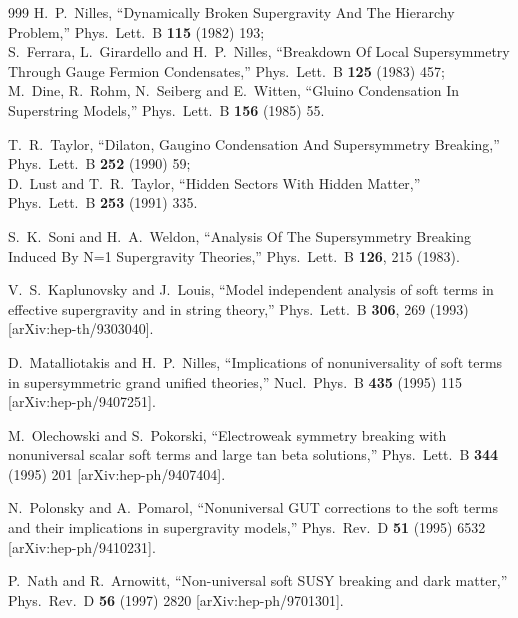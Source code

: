 \begin{thebibliography}{999}
H.~P.~Nilles,
``Dynamically Broken Supergravity And The Hierarchy Problem,''
Phys.\ Lett.\ B {\bf 115} (1982) 193;\\
S.~Ferrara, L.~Girardello and H.~P.~Nilles,
``Breakdown Of Local Supersymmetry Through Gauge Fermion Condensates,''
Phys.\ Lett.\ B {\bf 125} (1983) 457;\\
M.~Dine, R.~Rohm, N.~Seiberg and E.~Witten,
``Gluino Condensation In Superstring Models,''
Phys.\ Lett.\ B {\bf 156} (1985) 55.

  T.~R.~Taylor,
  ``Dilaton, Gaugino Condensation And Supersymmetry Breaking,''
  Phys.\ Lett.\ B {\bf 252} (1990) 59;\\
 D.~Lust and T.~R.~Taylor,
  ``Hidden Sectors With Hidden Matter,''
  Phys.\ Lett.\ B {\bf 253} (1991) 335.

  S.~K.~Soni and H.~A.~Weldon,
  ``Analysis Of The Supersymmetry Breaking Induced By N=1 Supergravity
  Theories,''
  Phys.\ Lett.\ B {\bf 126}, 215 (1983).

  V.~S.~Kaplunovsky and J.~Louis,
  ``Model independent analysis of soft terms in effective supergravity and in
  string theory,''
  Phys.\ Lett.\ B {\bf 306}, 269 (1993)
  [arXiv:hep-th/9303040].

  D.~Matalliotakis and H.~P.~Nilles,
  ``Implications of nonuniversality of soft terms in supersymmetric grand
  unified theories,''
  Nucl.\ Phys.\ B {\bf 435} (1995) 115
  [arXiv:hep-ph/9407251].

  M.~Olechowski and S.~Pokorski,
  ``Electroweak symmetry breaking with nonuniversal scalar soft terms and large
  tan beta solutions,''
  Phys.\ Lett.\ B {\bf 344} (1995) 201
  [arXiv:hep-ph/9407404].

  N.~Polonsky and A.~Pomarol,
  ``Nonuniversal GUT corrections to the soft terms and their implications in
  supergravity models,''
  Phys.\ Rev.\ D {\bf 51} (1995) 6532
  [arXiv:hep-ph/9410231].

  P.~Nath and R.~Arnowitt,
  ``Non-universal soft SUSY breaking and dark matter,''
  Phys.\ Rev.\ D {\bf 56} (1997) 2820
  [arXiv:hep-ph/9701301].


\end{thebibliography}
